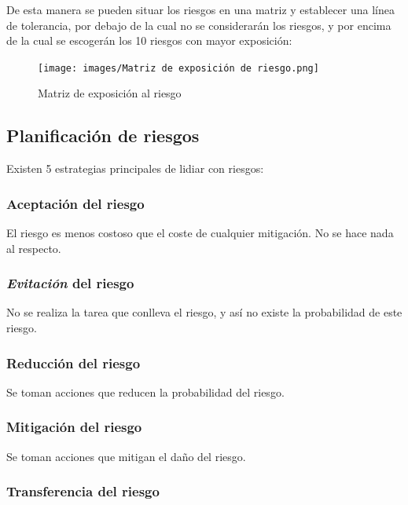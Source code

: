 \documentclass[12pt]{article}
\begin{document}
{De esta manera se pueden situar los riesgos en una matriz y establecer una línea de tolerancia, por debajo de la cual no se considerarán los riesgos, y por encima de la cual se escogerán los 10 riesgos con mayor exposición:}

\begin{figure} [ht]
    \centering
    \texttt{[image: images/Matriz de exposición de riesgo.png]}
    \caption{Matriz de exposición al riesgo}
    \label{fig:7.2}
\end{figure}

\newpage
\subsection{Planificación de riesgos}
\label{7.7.0}

{Existen 5 estrategias principales de lidiar con riesgos:}

\subsubsection{Aceptación del riesgo}
\label{7.7.1}

{El riesgo es menos costoso que el coste de cualquier mitigación. No se hace nada al respecto.}

\subsubsection{\textit{Evitación} del riesgo}
\label{7.7.2}

{No se realiza la tarea que conlleva el riesgo, y así no existe la probabilidad de este riesgo.}

\subsubsection{Reducción del riesgo}
\label{7.7.3}

{Se toman acciones que reducen la probabilidad del riesgo.}

\subsubsection{Mitigación del riesgo}
\label{7.7.4}

{Se toman acciones que mitigan el daño del riesgo.}

\subsubsection{Transferencia del riesgo}
\label{7.7.5}
\end{document}
